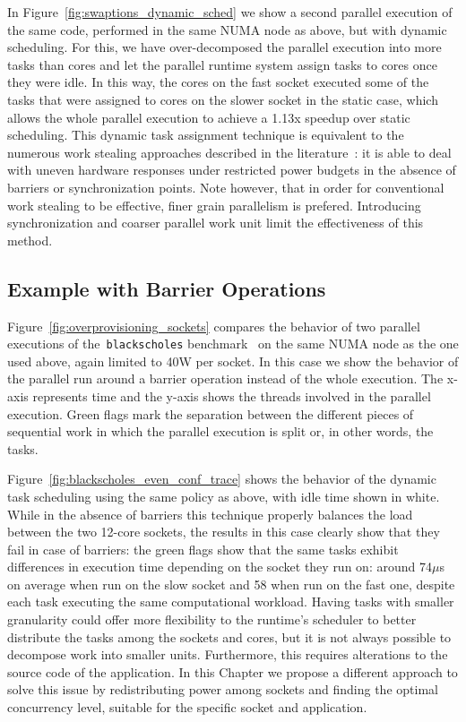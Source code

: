 In Figure~\ref{fig:swaptions_dynamic_sched} we show a second parallel execution of the
same code, performed in the same NUMA node as above, but with dynamic scheduling.  For
this, we have over-decomposed the parallel execution into more tasks than cores and let
the parallel runtime system assign tasks to cores once they were idle.  In this way, the
cores on the fast socket executed some of the tasks that were assigned to cores on the
slower socket in the static case, which allows the whole parallel execution to achieve a
1.13x speedup over static scheduling.  This dynamic task assignment technique is
equivalent to the numerous work stealing approaches described in the
literature~\cite{Blumofe1999, Blumofe1995, Ravichandran2011, Zheng2011}: it is able to
deal with uneven hardware responses under restricted power budgets in the absence of
barriers or synchronization points.  Note however, that in order for conventional work
stealing to be effective, finer grain parallelism is prefered.  Introducing
synchronization and coarser parallel work unit limit the effectiveness of this method.


\subsection{Example with Barrier Operations}
\label{sec:barriers}

Figure~\ref{fig:overprovisioning_sockets} compares the behavior of two parallel executions
of the~\texttt{blackscholes} benchmark~\cite{Chasapis:2015:PEI:2836331.2829952} on the same NUMA node as the
one used above, again limited to 40W per socket.  In this case we show the behavior of the
parallel run around a barrier operation instead of the whole execution.  The x-axis
represents time and the y-axis shows the threads involved in the parallel execution.
Green flags mark the separation between the different pieces of sequential work in which
the parallel execution is split or, in other words, the tasks.

Figure~\ref{fig:blackscholes_even_conf_trace} shows the behavior of the dynamic task
scheduling using the same policy as above, with idle time shown in white.  While in the
absence of barriers this technique properly balances the load between the two 12-core
sockets, the results in this case clearly show that they fail in case of barriers: the
green flags show that the same tasks exhibit differences in execution time depending on
the socket they run on: around 74$\mu$s on average when run on the slow socket and 58 when
run on the fast one, despite each task executing the same computational workload.  Having
tasks with smaller granularity could offer more flexibility to the runtime's scheduler to 
better distribute the tasks among the sockets and cores, but it is not always possible to
decompose work into smaller units.  Furthermore, this requires alterations to the source
code of the application.  In this Chapter we propose a different approach to solve this
issue by redistributing power among sockets and finding the optimal concurrency level,
suitable for the specific socket and application.

